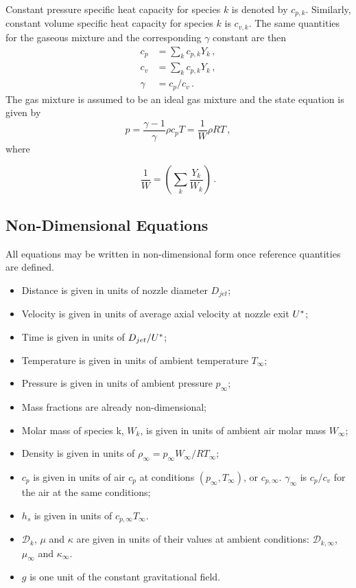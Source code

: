Constant pressure specific heat capacity for species $k$ is denoted by
$c_{p,k}$. Similarly, constant volume specific heat capacity for species
$k$ is $c_{v,k}$. The same quantities for the gaseous mixture and the
corresponding $\gamma$ constant are then
\begin{subequations}
 \begin{align}
  c_{p} &= \sum_{k} c_{p,k} Y_k \, , \\
  c_{v} &= \sum_{k} c_{p,k} Y_k \, , \\
  \gamma &= c_{p} / c_{v} \, .
 \end{align}
\end{subequations}
The gas mixture is assumed to be an ideal gas mixture and the state equation is
given by
\begin{equation}
 p =  \frac{\gamma -1}{\gamma} \rho c_p T = \frac{1}{W}\rho R T \, ,
\end{equation} where

\begin{equation}
 \frac{1}{W}=\left( \sum_k \frac{Y_k}{W_k} \right) \, .
\end{equation}





\subsection{Non-Dimensional Equations}

All equations may be written in non-dimensional form once
reference quantities are defined.
\begin{itemize}
 \item Distance is given in units of nozzle diameter $D_{jet}$;
 \item Velocity is given in units of average axial velocity
at nozzle exit $U^{*}$;
 \item Time is given in units of $ D_{jet} / U^{*}$;      
 \item Temperature is given in units of ambient temperature $T_{\infty}$;
 \item Pressure is given in units of ambient pressure $p_{\infty}$;
 \item Mass fractions are already non-dimensional;
 \item Molar mass of species k, $W_k$, is given in units of ambient air
molar mass $W_{\infty}$;
 \item Density is given in units of $\rho_{\infty}=p_{\infty} W_{\infty} / R T_{\infty}$;
 \item $c_p$ is given in units of air $c_p$ at conditions $(p_{\infty},T_{\infty})$, or
$c_{p,\infty}$. $\gamma_{\infty}$ is $c_p / c_v$ for the air at the same conditions;
 \item $h_s$ is given in units of $c_{p,\infty} T_{\infty}$.
 \item $\mathcal{D}_k$, $\mu$ and $\kappa$ are given in units of their values at ambient conditions: $\mathcal{D}_{k,\infty}$, $\mu_{\infty}$ and $\kappa_{\infty}$.
 \item $g$ is one unit of the constant gravitational field.
\end{itemize}

